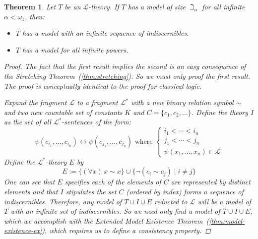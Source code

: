 \documentclass{amsart}
\newtheorem{theorem}{Theorem}[section]
\theoremstyle{definition}
\numberwithin{equation}{theorem}
\newcommand{\frag}{\mathcal{L}}
\begin{document}
\begin{theorem}\label{thm:hanf}
  Let $T$ be an $\frag$-theory.
  If $T$ has a model of size $\beth_\alpha$ for all infinite $\alpha<\omega_1$, then:
  \begin{itemize}
  \item $T$ has a model with an infinite sequence of indiscernibles.
  \item $T$ has a model for all infinite powers.
  \end{itemize}
  \begin{proof}
    The fact that the first result implies the second is an easy consequence of the Stretching Theorem~(\ref{thm:stretching}).
    So we must only proof the first result.
    The proof is conceptually identical to the proof for classical logic.
    
    Expand the fragment $\frag$ to a fragment $\frag^*$ with a new binary relation symbol $\sim$ and two new countable set of constants $K$ and $C=\{c_1,c_2,\dots\}$.
    Define the theory $I$ as the set of all $\frag^*$-sentences of the form:
    \[
      \psi(c_{i_1},\dots,c_{i_n})\leftrightarrow \psi(c_{j_1},\dots,c_{j_n})\text{ where }\left\{\begin{array}{l}i_1<\cdots<i_n\\j_1<\cdots<j_n\\\psi(x_1,\dots,x_n)\in\frag\end{array}\right.
    \]
    Define the $\frag^*$-theory $E$ by
    \[
      E:=\{(\forall x)\,x\sim x\}\cup\{\neg(c_i\sim c_j) \mid i\neq j\}
    \]
    One can see that $E$ specifies each of the elements of $C$ are represented by distinct elements and that $I$ stipulates the set $C$ (ordered by index) forms a sequence of indiscernibles.
    Therefore, any model of $T\cup I\cup E$ reducted to $\frag$ will be a model of $T$ with an infinite set of indiscernibles.
    So we need only find a model of $T\cup I\cup E$, which we accomplish with the Extended Model Existence Theorem~(\ref{thm:model-existence-ex}), which requires us to define a consistency property.
    

\end{proof}
\end{theorem}
\end{document}

